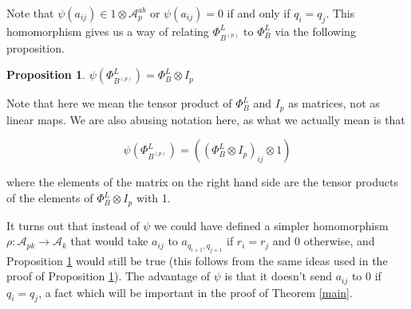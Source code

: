 \documentclass[11pt]{amsart}
\def\A{{\mathcal A}}
\newtheorem{prop}[thm]{Proposition}
\begin{document}
\noindent Note that $\psi(a_{ij}) \in 1\otimes \A^{ab}_p$ or $\psi(a_{ij}) = 0$ if and only if $q_i = q_j$.  This homomorphism gives us a way of relating $\Phi_{B^{(p)}}^L$ to $\Phi_B^L$ via the following proposition.

\begin{prop}\label{psiofbp}
$\psi\left(\Phi_{B^{(p)}}^L\right) = \Phi_{B}^L\otimes I_p$
\end{prop}


Note that here we mean the tensor product of $\Phi_B^L$ and $I_p$ as matrices, not as linear maps.  We are also abusing notation here, as what we actually mean is that

$$\psi\left(\Phi_{B^{(p)}}^L\right) = \left(\left(\Phi_{B}^L\otimes I_p\right)_{ij}\otimes 1\right)$$

where the elements of the matrix on the right hand side are the tensor products of the elements of $\Phi_{B}^L\otimes I_p$ with 1. 

It turns out that instead of $\psi$ we could have defined a simpler homomorphism $\rho\colon \A_{pk}\rightarrow \A_k$ that would take $a_{ij}$ to $a_{q_{i+1},q_{j+1}}$ if $r_i=r_j$ and 0 otherwise, and Proposition \ref{psiofbp} would still be true (this follows from the same ideas used in the proof of Proposition \ref{psiofbp}).  The advantage of $\psi$ is that it doesn't send $a_{ij}$ to 0 if $q_i=q_j$, a fact which will be important in the proof of Theorem \ref{main}.
\end{document}
